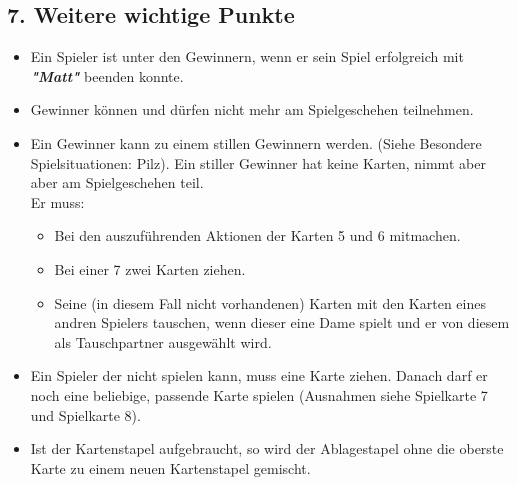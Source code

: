 \documentclass{article}
\begin{document}
\subsection*{7. Weitere wichtige Punkte}
\begin{itemize}

\item Ein Spieler ist unter den Gewinnern, wenn er sein Spiel erfolgreich mit \textit{\textbf{"Matt"}} beenden konnte.

\item Gewinner können und dürfen nicht mehr am Spielgeschehen teilnehmen.

\item Ein Gewinner kann zu einem stillen Gewinnern werden. (Siehe Besondere Spielsituationen: Pilz). Ein stiller Gewinner hat keine Karten, nimmt aber aber am Spielgeschehen teil. \\

Er muss:
\begin{itemize}

\item Bei den auszuführenden Aktionen der Karten 5 und 6 mitmachen.

\item Bei einer 7 zwei Karten ziehen.

\item Seine (in diesem Fall nicht vorhandenen) Karten mit den Karten eines andren Spielers tauschen, wenn dieser eine Dame spielt und er von diesem als Tauschpartner ausgewählt wird.
\end{itemize}

\item Ein Spieler der nicht spielen kann, muss eine Karte ziehen. Danach darf er noch eine beliebige, passende Karte spielen (Ausnahmen siehe Spielkarte 7 und Spielkarte 8).

\item Ist der Kartenstapel aufgebraucht, so wird der Ablagestapel ohne die oberste Karte zu einem neuen Kartenstapel gemischt.
\end{itemize}
\end{document}
